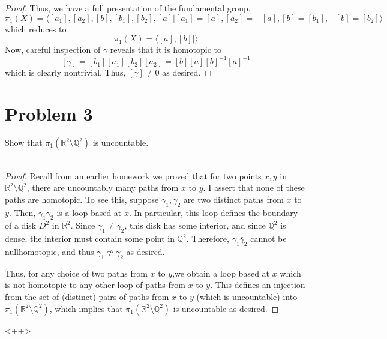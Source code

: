 \documentclass[fontsize=11pt]{scrartcl} %
\numberwithin{equation}{section} %
\numberwithin{figure}{section} %
\numberwithin{table}{section} %
\newcommand{\R}{\mathbb{R}}
\newcommand{\Q}{\mathbb{Q}}
\begin{document}
\begin{proof}
    Thus, we have a full presentation of the fundamental group. 
    \[
        \pi_1(X) = \langle [a_1],[a_2],[b],[b_1],[b_2],[a]|
        [a_1]=[a],[a_2]=-[a],[b]=[b_1],-[b]=[b_2]\rangle
    \]
    which reduces to
    \[
        \pi_1(X) = \langle [a],[b]|\rangle
    \]
    Now, careful inspection of $\gamma$ reveals that it is homotopic to
    \[
        [\gamma] = [b_1][a_1][b_2][a_2] = [b][a][b]^{-1}[a]^{-1}
    \]
    which is clearly nontrivial. Thus, $[\gamma] \neq 0$ as desired.
\end{proof}


\section*{Problem 3}
Show that $\pi_1(\R^2\setminus\Q^2)$ is uncountable.
\\
\\
\begin{proof}
    Recall from an earlier homework we proved that for two points $x,y$ in
    $\R^2\setminus \Q^2$, there are uncountably many paths from $x$ to $y$. I
    assert that none of these paths are homotopic. To see this, suppose
    $\gamma_1,\gamma_2$ are two distinct paths from $x$ to $y$. Then,
    $\gamma_1\bar{\gamma}_2$ is a loop based at $x$. In particular, this loop
    defines the boundary of a disk $D^2$ in $\R^2$. Since $\gamma_1\neq
    \gamma_2$, this disk has some interior, and since $\Q^2$ is dense, the
    interior must contain some point in $\Q^2$. Therefore,
    $\gamma_1\bar{\gamma}_2$ cannot be nullhomotopic, and thus
    $\gamma_1\not\simeq\gamma_2$ as desired.

    Thus, for any choice of two paths from $x$ to $y$,we obtain a loop based at
    $x$ which is not homotopic to any other loop of paths from $x$ to $y$. This
    defines an injection from the set of (distinct) pairs of paths from $x$ to
    $y$ (which is uncountable) into $\pi_1(\R^2\setminus\Q^2)$, which implies
    that $\pi_1(\R^2\setminus\Q^2)$ is uncountable as desired.
\end{proof}<++>
\end{document}
